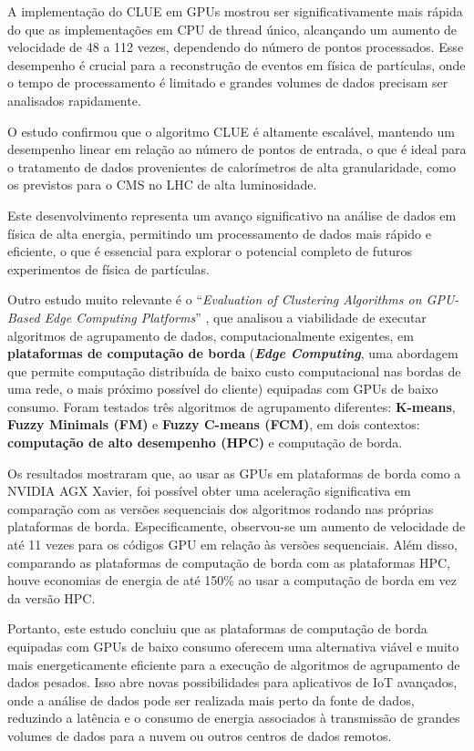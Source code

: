 \documentclass[12pt,
openright, 
oneside, %
a4paper,    %
brazil]{facom-ufu-abntex2}
\begin{document}
A implementação do CLUE em GPUs mostrou ser significativamente mais rápida do que as implementações em CPU de thread único, alcançando um aumento de velocidade de 48 a 112 vezes, dependendo do número de pontos processados. Esse desempenho é crucial para a reconstrução de eventos em física de partículas, onde o tempo de processamento é limitado e grandes volumes de dados precisam ser analisados rapidamente.

O estudo confirmou que o algoritmo CLUE é altamente escalável, mantendo um desempenho linear em relação ao número de pontos de entrada, o que é ideal para o tratamento de dados provenientes de calorímetros de alta granularidade, como os previstos para o CMS no LHC de alta luminosidade.

Este desenvolvimento representa um avanço significativo na análise de dados em física de alta energia, permitindo um processamento de dados mais rápido e eficiente, o que é essencial para explorar o potencial completo de futuros experimentos de física de partículas.

Outro estudo muito relevante é o \enquote{\textit{Evaluation of Clustering Algorithms on GPU-Based Edge Computing Platforms}} \cite{edgeComputingGPUsIOT2020}, que analisou a viabilidade de executar algoritmos de agrupamento de dados, computacionalmente exigentes, em \textbf{plataformas de computação de borda} (\textbf{\textit{Edge Computing}}, uma abordagem que permite computação distribuída de baixo custo computacional nas bordas de uma rede, o mais próximo possível do cliente) equipadas com GPUs de baixo consumo. Foram testados três algoritmos de agrupamento diferentes: \textbf{K-means}, \textbf{Fuzzy Minimals (FM)} e \textbf{Fuzzy C-means (FCM)}, em dois contextos: \textbf{computação de alto desempenho (HPC)} e computação de borda.

Os resultados mostraram que, ao usar as GPUs em plataformas de borda como a NVIDIA AGX Xavier, foi possível obter uma aceleração significativa em comparação com as versões sequenciais dos algoritmos rodando nas próprias plataformas de borda. Especificamente, observou-se um aumento de velocidade de até 11 vezes para os códigos GPU em relação às versões sequenciais. Além disso, comparando as plataformas de computação de borda com as plataformas HPC, houve economias de energia de até 150\% ao usar a computação de borda em vez da versão HPC.

Portanto, este estudo concluiu que as plataformas de computação de borda equipadas com GPUs de baixo consumo oferecem uma alternativa viável e muito mais energeticamente eficiente para a execução de algoritmos de agrupamento de dados pesados. Isso abre novas possibilidades para aplicativos de IoT avançados, onde a análise de dados pode ser realizada mais perto da fonte de dados, reduzindo a latência e o consumo de energia associados à transmissão de grandes volumes de dados para a nuvem ou outros centros de dados remotos.
\end{document}
